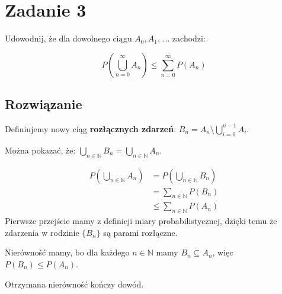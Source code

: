 \section{Zadanie 3}

Udowodnij, że dla dowolnego ciągu \(A_0, A_1\), ... zachodzi:

\[
	P(\bigcup_{n = 0}^{\infty} A_n) \leq \sum_{n = 0}^{\infty} P(A_n)
\]

\subsection*{Rozwiązanie}
Definiujemy nowy ciąg \textbf{rozłącznych zdarzeń}:
\(\displaystyle
B_n = A_n \setminus \bigcup_{i = 0}^{n-1} A_i
\).

Można pokazać, że:
\(\displaystyle
\bigcup_{n \in \mathbb{N}} B_n = \bigcup_{n \in \mathbb{N}} A_n
\).

\begin{align*}
	P\left(\bigcup_{n \in \mathbb{N}} A_n\right)
	 & = P\left(\bigcup_{n \in \mathbb{N}} B_n\right) \\
	 & = \sum_{n \in \mathbb{N}} P(B_n)               \\
	 & \leq \sum_{n \in \mathbb{N}} P(A_n)
\end{align*}
Pierwsze przejście mamy z definicji miary probabilistycznej, dzięki temu że
zdarzenia w rodzinie \(\{B_n\}\) są parami rozłączne.

Nierówność mamy, bo dla każdego \(n \in \mathbb{N}\) mamy \(B_n \subseteq A_n\), więc \(P(B_n) \leq P(A_n)\).

Otrzymana nierówność kończy dowód.
